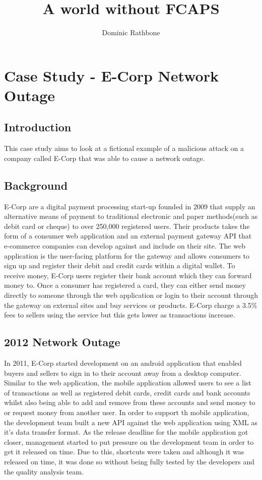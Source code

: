 \documentclass[]{report}
\title{A world without FCAPS}
\author{Dominic Rathbone}
\begin{document}
\maketitle

\chapter{Case Study - E-Corp Network Outage}
\section*{Introduction}
This case study aims to look at a fictional example of a malicious attack on a company called E-Corp that was able to cause a network outage.

\section*{Background}
E-Corp are a digital payment processing start-up founded in 2009 that supply an alternative means of payment to traditional electronic and paper methods(such as debit card or cheque) to over 250,000 registered users. Their products takes the form of a consumer web application and an external payment gateway API that e-commerce companies can develop against and include on their site. The web application is the user-facing platform for the gateway and allows consumers to sign up and register their debit and credit cards within a digital wallet. To receive money, E-Corp users register their bank account which they can forward money to. Once a consumer has registered a card, they can either send money directly to someone through the web application or login to their account through the gateway on external sites and buy services or products. E-Corp charge a 3.5\% fees to sellers using the service but this gets lower as transactions increase. 
	
\section*{2012 Network Outage}
In 2011, E-Corp started development on an android application that enabled buyers and sellers to sign in to their account away from a desktop computer. Similar to the web application, the mobile application allowed users to see a list of transactions as well as registered debit cards, credit cards and bank accounts whilst also being able to add and remove from these accounts and send money to or request money from another user. In order to support th mobile application, the development team built a new API against the web application using XML as it's data transfer format. As the release deadline for the mobile application got closer, management started to put pressure on the development team in order to get it released on time. Due to this, shortcuts were taken and although it was released on time, it was done so without being fully tested by the developers and the quality analysis team.
	
\end{document}
